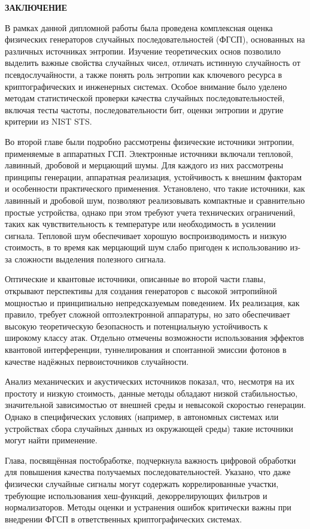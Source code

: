 \clearpage
\textbf{ЗАКЛЮЧЕНИЕ}

В рамках данной дипломной работы была проведена комплексная оценка
физических генераторов случайных последовательностей (ФГСП), основанных
на различных источниках энтропии. Изучение теоретических основ позволило
выделить важные свойства случайных чисел, отличать истинную случайность
от псевдослучайности, а также понять роль энтропии как ключевого ресурса
в криптографических и инженерных системах. Особое внимание было уделено
методам статистической проверки качества случайных последовательностей,
включая тесты частоты, последовательности бит, оценки энтропии и другие
критерии из NIST STS.

Во второй главе были подробно рассмотрены физические источники энтропии,
применяемые в аппаратных ГСП. Электронные источники включали тепловой,
лавинный, дробовой и мерцающий шумы. Для каждого из них рассмотрены
принципы генерации, аппаратная реализация, устойчивость к внешним
факторам и особенности практического применения. Установлено, что такие
источники, как лавинный и дробовой шум, позволяют реализовывать
компактные и сравнительно простые устройства, однако при этом требуют
учета технических ограничений, таких как чувствительность к температуре
или необходимость в усилении сигнала. Тепловой шум обеспечивает хорошую
воспроизводимость и низкую стоимость, в то время как мерцающий шум слабо
пригоден к использованию из-за сложности выделения полезного сигнала.

Оптические и квантовые источники, описанные во второй части главы,
открывают перспективы для создания генераторов с высокой энтропийной
мощностью и принципиально непредсказуемым поведением. Их реализация, как
правило, требует сложной оптоэлектронной аппаратуры, но зато
обеспечивает высокую теоретическую безопасность и потенциальную
устойчивость к широкому классу атак. Отдельно отмечены возможности
использования эффектов квантовой интерференции, туннелирования и
спонтанной эмиссии фотонов в качестве надёжных первоисточников
случайности.

Анализ механических и акустических источников показал, что, несмотря на
их простоту и низкую стоимость, данные методы обладают низкой
стабильностью, значительной зависимостью от внешней среды и невысокой
скоростью генерации. Однако в специфических условиях (например, в
автономных системах или устройствах сбора случайных данных из окружающей
среды) такие источники могут найти применение.

Глава, посвящённая постобработке, подчеркнула важность цифровой
обработки для повышения качества получаемых последовательностей.
Указано, что даже физически случайные сигналы могут содержать
коррелированные участки, требующие использования хеш-функций,
декоррелирующих фильтров и нормализаторов. Методы оценки и устранения
ошибок критически важны при внедрении ФГСП в ответственных
криптографических системах.


